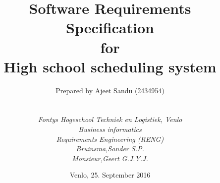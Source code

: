 
\def\Company{Consultancy}
\def\Institute{\textit{Fontys Hogeschool Techniek en Logistiek, Venlo}}
\def\Course{\textit{Business informatics}}
\def\Module{\textit{ Requirements Engineering (RENG)}}
\def\Docent{\textit{Bruinsma,Sander S.P.}}
\def\Assistant{\textit{Monsieur,Geert G.J.Y.J.}}

\def\BoldTitle{Software Requirements Specification}

\def\Subtitle{for \\ High school scheduling system \\}
\def\Authors{Prepared by Ajeet Sandu (2434954) } 
\def\Shortname{A.Sandu}


\title{\textbf{\BoldTitle}\\\Subtitle}
\author{\Authors \\ \\ \\ \Institute\\ \Course\\ \Module\\ \Docent\\ \Assistant}
\date{Venlo, 25. September 2016}

